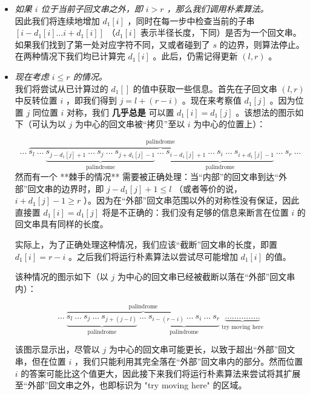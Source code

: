 \begin{itemize}
    \item \textit{如果 $i$ 位于当前子回文串之外，即 $i > r$ ，那么我们调用朴素算法。}\\
    因此我们将连续地增加 $d_1[i]$ ，同时在每一步中检查当前的子串 $[i - d_1[i] \dots i + d_1[i]]$ （$d_1[i]$ 表示半径长度，下同）是否为一个回文串。如果我们找到了第一处对应字符不同，又或者碰到了 $s$ 的边界，则算法停止。在两种情况下我们均已计算完 $d_1[i]$ 。此后，仍需记得更新 $(l, r)$ 。
    \item \textit{现在考虑 $i \le r$ 的情况。}\\
    我们将尝试从已计算过的 $d_1[]$ 的值中获取一些信息。首先在子回文串 $(l, r)$ 中反转位置 $i$ ，即我们得到 $j = l + (r - i)$ 。现在来考察值 $d_1[j]$ 。因为位置 $j$ 同位置 $i$ 对称，我们 \textbf{几乎总是} 可以置 $d_1[i] = d_1[j]$ 。该想法的图示如下（可认为以 $j$ 为中心的回文串被“拷贝”至以 $i$ 为中心的位置上）：

    $$
    \ldots\
    \overbrace{
        s_l\ \ldots\
        \underbrace{
            s_{j-d_1[j]+1}\ \ldots\ s_j\ \ldots\ s_{j+d_1[j]-1}
        }_\text{palindrome}\
        \ldots\
        \underbrace{
            s_{i-d_1[j]+1}\ \ldots\ s_i\ \ldots\ s_{i+d_1[j]-1}
        }_\text{palindrome}\
        \ldots\ s_r
    }^\text{palindrome}\
    \ldots
    $$
    然而有一个 **棘手的情况** 需要被正确处理：当“内部”的回文串到达“外部”回文串的边界时，即 $j - d_1[j] + 1 \le l$ （或者等价的说， $i + d_1[j] - 1 \ge r$ ）。因为在“外部”回文串范围以外的对称性没有保证，因此直接置 $d_1[i] = d_1[j]$ 将是不正确的：我们没有足够的信息来断言在位置 $i$ 的回文串具有同样的长度。

    实际上，为了正确处理这种情况，我们应该“截断”回文串的长度，即置 $d_1[i] = r - i$ 。之后我们将运行朴素算法以尝试尽可能增加 $d_1[i]$ 的值。

    该种情况的图示如下（以 $j$ 为中心的回文串已经被截断以落在“外部”回文串内）：

    $$
    \ldots\
    \overbrace{
        \underbrace{
            s_l\ \ldots\ s_j\ \ldots\ s_{j+(j-l)}
        }_\text{palindrome}\
        \ldots\
        \underbrace{
            s_{i-(r-i)}\ \ldots\ s_i\ \ldots\ s_r
        }_\text{palindrome}
    }^\text{palindrome}\
    \underbrace{
        \ldots \ldots \ldots \ldots \ldots
    }_\text{try moving here}
    $$

    该图示显示出，尽管以 $j$ 为中心的回文串可能更长，以致于超出“外部”回文串，但在位置 $i$ ，我们只能利用其完全落在“外部”回文串内的部分。然而位置 $i$ 的答案可能比这个值更大，因此接下来我们将运行朴素算法来尝试将其扩展至“外部”回文串之外，也即标识为 "try moving here" 的区域。
\end{itemize}\par

